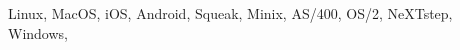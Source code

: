 \begin{par}
  \small{Linux, MacOS, iOS, Android, Squeak, Minix,
    AS/400, OS/2, NeXTstep, Windows, \AppleII}
\end{par}
